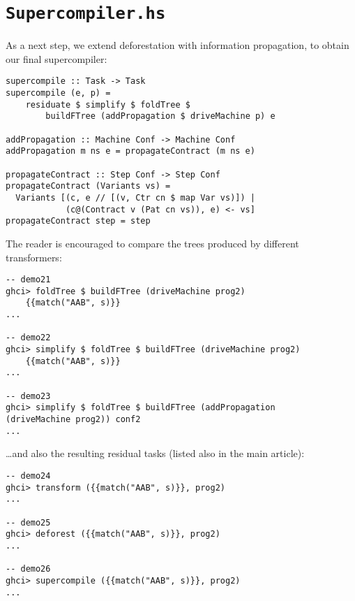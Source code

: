\section{\texttt{Supercompiler.hs}}

As a next step, we extend deforestation with information propagation,
to obtain our final supercompiler:
\begin{lstlisting}[name=supercompiler]
supercompile :: Task -> Task
supercompile (e, p) =
	residuate $ simplify $ foldTree $ 
		buildFTree (addPropagation $ driveMachine p) e

addPropagation :: Machine Conf -> Machine Conf
addPropagation m ns e = propagateContract (m ns e)

propagateContract :: Step Conf -> Step Conf
propagateContract (Variants vs) =
  Variants [(c, e // [(v, Ctr cn $ map Var vs)]) | 
            (c@(Contract v (Pat cn vs)), e) <- vs]
propagateContract step = step
\end{lstlisting}

The reader is encouraged to compare the trees produced by different transformers:

\begin{lstlisting}[style=demo,escapechar=!]
-- demo21
ghci> foldTree $ buildFTree (driveMachine prog2) 
	{{match("AAB", s)}}
...

-- demo22
ghci> simplify $ foldTree $ buildFTree (driveMachine prog2) 
	{{match("AAB", s)}}
...

-- demo23
ghci> simplify $ foldTree $ buildFTree (addPropagation 
(driveMachine prog2)) conf2
...
\end{lstlisting}

\ldots and also the resulting residual tasks (listed also in the main article):
\begin{lstlisting}[style=demo,escapechar=!]
-- demo24
ghci> transform ({{match("AAB", s)}}, prog2)
...

-- demo25
ghci> deforest ({{match("AAB", s)}}, prog2)
...

-- demo26
ghci> supercompile ({{match("AAB", s)}}, prog2)
...
\end{lstlisting}
